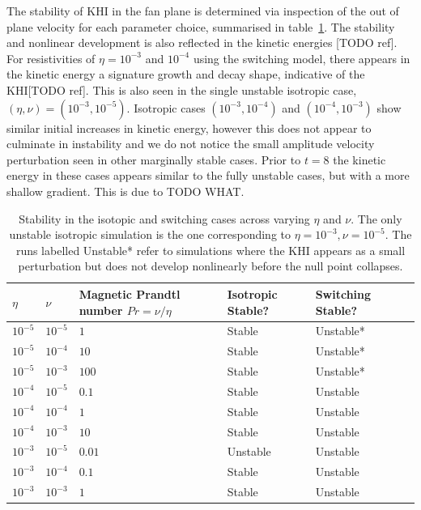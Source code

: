 The stability of KHI in the fan plane is determined via inspection of the out of plane velocity for each parameter choice, summarised in table~\ref{tab:stability}. The stability and nonlinear development is also reflected in the kinetic energies [TODO ref]. For resistivities of $\eta = 10^{-3}$ and $10^{-4}$ using the switching model, there appears in the kinetic energy a signature growth and decay shape, indicative of the KHI[TODO ref]. This is also seen in the single unstable isotropic case, $(\eta, \nu) = (10^{-3}, 10^{-5})$. Isotropic cases $(10^{-3}, 10^{-4})$ and $(10^{-4}, 10^{-3})$ show similar initial increases in kinetic energy, however this does not appear to culminate in instability and we do not notice the small amplitude velocity perturbation seen in other marginally stable cases. Prior to $t = 8$ the kinetic energy in these cases appears similar to the fully unstable cases, but with a more shallow gradient. This is due to TODO WHAT.

\begin{table}[]
\centering
\begin{tabular}{llllll}
$\eta$    & $\nu$    & Magnetic Prandtl number $Pr = \nu/\eta$ & Isotropic Stable? & Switching Stable? &  \\
\midrule
$10^{-5}$ & $10^{-5}$ & $1$ & Stable                 & Unstable*          &  \\
$10^{-5}$ & $10^{-4}$ & $10$ & Stable                 & Unstable*          &  \\
$10^{-5}$ & $10^{-3}$ & $100$ & Stable                 & Unstable*          &  \\
$10^{-4}$ & $10^{-5}$ & $0.1$ & Stable                 & Unstable                 &  \\
$10^{-4}$ & $10^{-4}$ & $1$ & Stable                 & Unstable                 &  \\
$10^{-4}$ & $10^{-3}$ & $10$ & Stable                 & Unstable                 &  \\
$10^{-3}$ & $10^{-5}$ & $0.01$ & Unstable                 & Unstable                 &  \\
$10^{-3}$ & $10^{-4}$ & $0.1$ & Stable                 & Unstable                 &  \\
$10^{-3}$ & $10^{-3}$ & $1$ & Stable                 & Unstable                 & 
\end{tabular}
\caption{Stability in the isotopic and switching cases across varying $\eta$ and $\nu$. The only unstable isotropic simulation is the one corresponding to $\eta = 10^{-3}, \nu = 10^{-5}$. The runs labelled Unstable* refer to simulations where the KHI appears as a small perturbation but does not develop nonlinearly before the null point collapses.}
\label{tab:stability}
\end{table}

